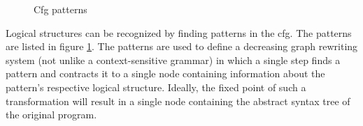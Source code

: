\documentclass[leqno,11pt]{article}
\begin{document}
\begin{figure}[h!]
  \centering
  \hspace{1cm}             
  \hspace{1cm}             
  \hspace{1cm}             
  \caption{Cfg patterns}
  \label{fig:cfg_patterns}
\end{figure}

Logical structures can be recognized by finding patterns in the cfg. The patterns are listed in figure \ref{fig:cfg_patterns}. The patterns are used to define a decreasing graph rewriting system (not unlike a context-sensitive grammar) in which a single step finds a pattern and contracts it to a single node containing information about the pattern's respective logical structure. Ideally, the fixed point of such a transformation will result in a single node containing the abstract syntax tree of the original program.
\end{document}
